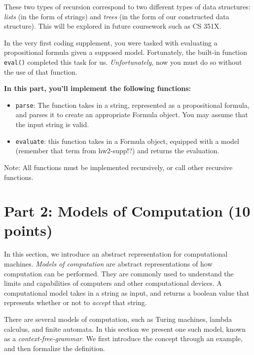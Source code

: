 \documentclass{article}
\begin{document}
    \vspace{2mm}
    These two types of recursion correspond to two different types of data structures: \textit{lists} (in the form of strings) and \textit{trees} (in the form of our constructed data structure). This will be explored in future coursework such as CS 351X.

\begin{tcolorbox}[enhanced,interior style={top color=Dandelion!20,bottom color=Dandelion!30}]
    In the very first coding supplement, you were tasked with evaluating a propositional formula given a supposed model. Fortunately, the built-in function \lstinline{eval()} completed this task for us. \textit{Unfortunately}, now you must do so without the use of that function.
    
    \textbf{In this part, you'll implement the following functions:}
    \begin{itemize}
        \item \lstinline{parse}: The function takes in a string, represented as a propositional formula, and parses it to create an appropriate Formula object. You may assume that the input string is valid.
        \item \lstinline{evaluate}: this function takes in a Formula object, equipped with a model (remember that term from hw2-supp!?) and returns the evaluation. 
    \end{itemize}

    Note: All functions must be implemented recursively, or call other recursive functions.
\end{tcolorbox}

\section*{Part 2: Models of Computation (10 points)}
    In this section, we introduce an abstract representation for computational machines. \textit{Models of computation} are abstract representations of how computation can be performed. They are commonly used to understand the limits and capabilities of computers and other computational devices. A computational model takes in a string as input, and returns a boolean value that represents whether or not to \textit{accept} that string.

    \vspace{3mm}
    There are several models of computation, such as Turing machines, lambda calculus, and finite automata. In this section we present one such model, known as a \textit{context-free-grammar}. We first introduce the concept through an example, and then formalize the definition.
    
\end{document}
